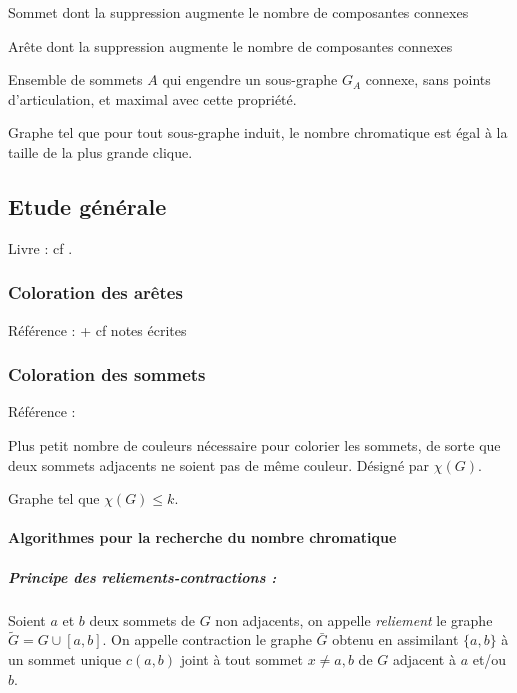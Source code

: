 \begin{defin}
Sommet dont la suppression augmente le nombre de composantes connexes
\end{defin}

\begin{defin}[Isthme]
Arête dont la suppression augmente le nombre de composantes connexes
\end{defin}

\begin{defin}[Bloc]
Ensemble de sommets $A$ qui engendre un sous-graphe $G_A$ connexe, sans points d'articulation,
et maximal avec cette propriété.
\end{defin}

\begin{defin}
Graphe tel que pour tout sous-graphe induit, le nombre chromatique est égal à la taille de la plus grande clique.
\end{defin}

\subsection{Etude générale}
Livre : cf \cite{berge-graphes}.
\subsubsection{Coloration des arêtes}
Référence : \cite{berge-arretes} + cf notes écrites
\subsubsection{Coloration des sommets}
Référence : \cite{berge-sommets}
\setcounter{defin}{0}

\begin{defin}
Plus petit nombre de couleurs nécessaire pour colorier les sommets, de 
sorte que deux sommets adjacents ne soient pas de même couleur.
Désigné par $\chi(G)$.
\end{defin}

\begin{defin}
Graphe tel que $\chi(G) \leq k$.
\end{defin}


\paragraph{Algorithmes pour la recherche du nombre chromatique}
\subparagraph{Principe des reliements-contractions :}
Soient $a$ et $b$ deux sommets de $G$ non adjacents,
on appelle \textit{reliement} le graphe $\tilde{G}=G \cup [a,b]$.
On appelle contraction le graphe $\bar{G}$ obtenu en assimilant
$\{ a,b \}$ à un sommet unique $c(a,b)$ joint à tout sommet $x \neq a,b$ de
$G$ adjacent à $a$ et/ou $b$.


